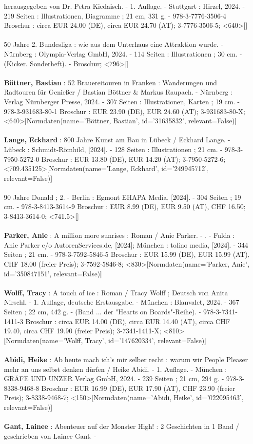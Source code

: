 \documentclass{article}
\begin{document}
\begin{multicols}{3}
herausgegeben von Dr. Petra Kiedaisch. - 1. Auflage. - Stuttgart : Hirzel, 2024. - 219 Seiten : Illustrationen, Diagramme ; 21 cm, 331 g. - 978-3-7776-3506-4 Broschur : circa EUR 24.00 (DE), circa EUR 24.70 (AT); 3-7776-3506-5; <640>[]\\\\50 Jahre 2. Bundesliga : wie aus dem Unterhaus eine Attraktion wurde. - Nürnberg : Olympia-Verlag GmbH, 2024. - 114 Seiten : Illustrationen ; 30 cm. - (Kicker. Sonderheft). - Broschur; <796>[]\\\\\textbf{Böttner, Bastian} : 52 Brauereitouren in Franken : Wanderungen und Radtouren für Genießer / Bastian Böttner \& Markus Raupach. - Nürnberg : Verlag Nürnberger Presse, 2024. - 307 Seiten : Illustrationen, Karten ; 19 cm. - 978-3-931683-80-1 Broschur : EUR 23.90 (DE), EUR 24.60 (AT); 3-931683-80-X; <640>[Normdaten(name='Böttner, Bastian', id='31635832', relevant=False)]\\\\\textbf{Lange, Eckhard} : 800 Jahre Kunst am Bau in Lübeck / Eckhard Lange. - Lübeck : Schmidt-Römhild, [2024]. - 128 Seiten : Illustrationen ; 21 cm. - 978-3-7950-5272-0 Broschur : EUR 13.80 (DE), EUR 14.20 (AT); 3-7950-5272-6; <709.435125>[Normdaten(name='Lange, Eckhard', id='249945712', relevant=False)]\\\\90 Jahre Donald ; 2. - Berlin : Egmont EHAPA Media, [2024]. - 304 Seiten ; 19 cm. - 978-3-8413-3614-9 Broschur : EUR 8.99 (DE), EUR 9.50 (AT), CHF 16.50; 3-8413-3614-0; <741.5>[]\\\\\textbf{Parker, Anie} : A million more sunrises : Roman / Anie Parker. - . - Fulda : Anie Parker c/o AutorenServices.de, [2024]; München : tolino media, [2024]. - 344 Seiten ; 21 cm. - 978-3-7592-5846-5 Broschur : EUR 15.99 (DE), EUR 15.99 (AT), CHF 18.00 (freier Preis); 3-7592-5846-8; <830>[Normdaten(name='Parker, Anie', id='350847151', relevant=False)]\\\\\textbf{Wolff, Tracy} : A touch of ice : Roman / Tracy Wolff ; Deutsch von Anita Nirschl. - 1. Auflage, deutsche Erstausgabe. - München : Blanvalet, 2024. - 367 Seiten ; 22 cm, 442 g. - (Band ... der "Hearts on Boards"-Reihe). - 978-3-7341-1411-3 Broschur : circa EUR 14.00 (DE), circa EUR 14.40 (AT), circa CHF 19.40, circa CHF 19.90 (freier Preis); 3-7341-1411-X; <810>[Normdaten(name='Wolff, Tracy', id='147620334', relevant=False)]\\\\\textbf{Abidi, Heike} : Ab heute mach ich's mir selber recht : warum wir People Pleaser mehr an uns selbst denken dürfen / Heike Abidi. - 1. Auflage. - München : GRÄFE UND UNZER Verlag GmbH, 2024. - 239 Seiten ; 21 cm, 294 g. - 978-3-8338-9468-8 Broschur : EUR 16.99 (DE), EUR 17.90 (AT), CHF 23.90 (freier Preis); 3-8338-9468-7; <150>[Normdaten(name='Abidi, Heike', id='022095463', relevant=False)]\\\\\textbf{Gant, Lainee} : Abenteuer auf der Monster High! : 2 Geschichten in 1 Band / geschrieben von Lainee Gant. - 
\end{multicols}
\end{document}

